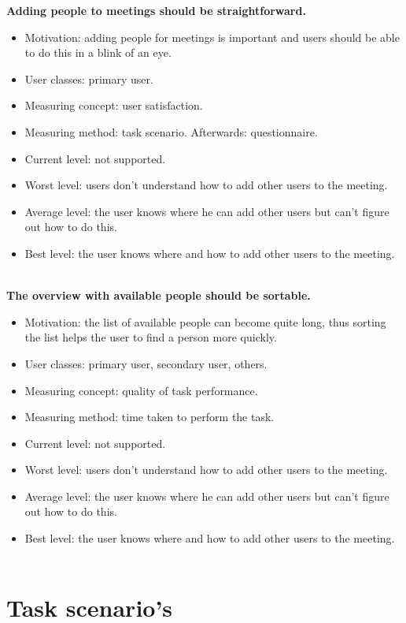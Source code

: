 \documentclass[11pt, a4paper,svglistings]{report}
\begin{document}
\textbf{Adding people to meetings should be straightforward.}
\begin{itemize}
\item{Motivation: adding people for meetings is important and users should be able to do this in a blink of an eye.}
\item{User classes: primary user.}
\item{Measuring concept: user satisfaction.}
\item{Measuring method: task scenario. Afterwards: questionnaire.}
\item{Current level: not supported.}
\item{Worst level: users don't understand how to add other users to the meeting.}
\item{Average level: the user knows where he can add other users but can't figure out how to do this.}
\item{Best level: the user knows where and how to add other users to the meeting. \\ \\}
\end{itemize}
\textbf{The overview with available people should be sortable.}
\begin{itemize}
\item{Motivation: the list of available people can become quite long, thus sorting the list helps the user to find a person more quickly.}
\item{User classes: primary user, secondary user, others.}
\item{Measuring concept: quality of task performance.}
\item{Measuring method: time taken to perform the task.}
\item{Current level: not supported.}
\item{Worst level: users don't understand how to add other users to the meeting.}
\item{Average level: the user knows where he can add other users but can't figure out how to do this.}
\item{Best level: the user knows where and how to add other users to the meeting. \\ \\}
\end{itemize}

\chapter{Task scenario's}
\end{document}
